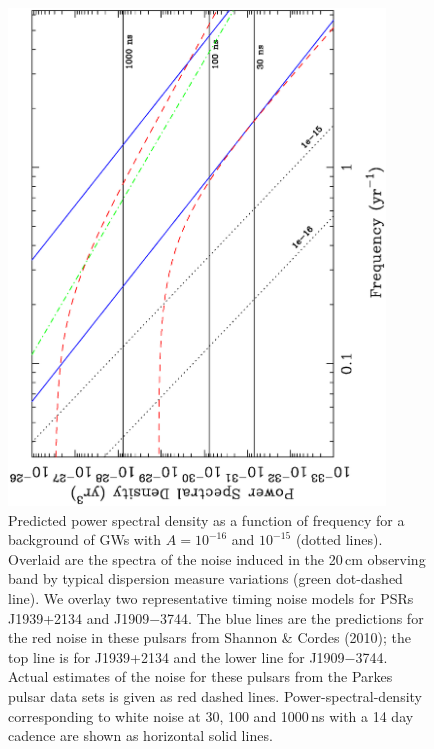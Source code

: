 \documentclass{raa}            %
\begin{document}
\begin{figure}
\begin{center}
\includegraphics[angle=-90,width=10cm]{noiseLimits.ps}
\caption{Predicted power spectral density as a function of frequency for a background of GWs with $A = 10^{-16}$ and $10^{-15}$ (dotted lines). Overlaid are the spectra of the noise induced in the 20\,cm observing band by typical dispersion measure variations (green dot-dashed line). We overlay two representative timing noise models for PSRs J1939+2134 and J1909$-$3744.  The blue lines are the predictions for the red noise in these pulsars from Shannon \& Cordes (2010); the top line is for J1939+2134 and the lower line for J1909$-$3744.  Actual estimates of the noise for these pulsars from the Parkes pulsar data sets is given as red dashed lines. Power-spectral-density corresponding to white noise at 30, 100 and 1000\,ns with a 14 day cadence are shown as horizontal solid lines.} \label{fg:noise}
\end{center}
\end{figure}
\end{document}
